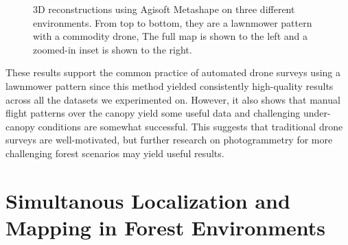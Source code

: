 \begin{figure}[H]
    \hfill
    \caption{3D reconstructions using Agisoft Metashape on three different environments. From top to bottom, they are a lawnmower pattern with a commodity drone,  The full map is shown to the left and a zoomed-in inset is shown to the right.}
    \label{fig:results:sfm}
\end{figure}

These results support the common practice of automated drone surveys using a lawnmower pattern since this method yielded consistently high-quality results across all the datasets we experimented on. However, it also shows that manual flight patterns over the canopy yield some useful data and challenging under-canopy conditions are somewhat successful. This suggests that traditional drone surveys are well-motivated, but further research on photogrammetry for more challenging forest scenarios may yield useful results.


\section{Simultanous Localization and Mapping in Forest Environments}

